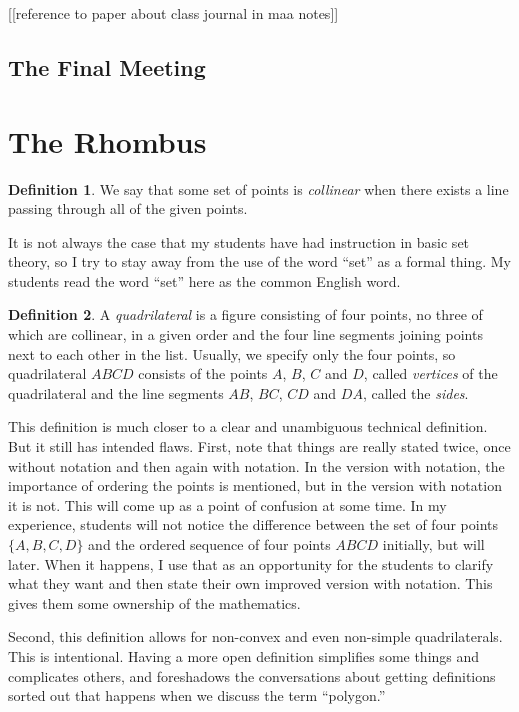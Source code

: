 \documentclass{tufte-handout}
\theoremstyle{definition}
\newtheorem*{definition}{Definition}
\begin{document}
[[reference to paper about class journal in maa notes]]


\subsection{The Final Meeting}

\clearpage
\setcounter{section}{1}
\section{The Rhombus}

\begin{definition}
\label{defn:collinear}
We say that some set of points is \emph{collinear} when there exists a line passing through all of the given points.
\end{definition}

It is not always the case that my students have had instruction in basic set theory, so I try to stay away from the use of the word ``set'' as a formal thing. My students read the word ``set'' here as the common English word.


\begin{definition}\label{defn:quadrilateral}
A \emph{quadrilateral} is a figure consisting of four points, no three of which are collinear, in a given order and the four line segments joining points next to each other in the list.
Usually, we specify only the four points, so quadrilateral $ABCD$ consists of the points $A$, $B$, $C$ and $D$, called \emph{vertices} of the quadrilateral and the line segments $AB$, $BC$, $CD$ and $DA$, called the \emph{sides}.
\end{definition}

This definition is much closer to a clear and unambiguous technical definition. But it still has intended flaws. 
First, note that things are really stated twice, once without notation and then again with notation. 
In the version with notation, the importance of ordering the points is mentioned, but in the version with notation it is not. 
This will come up as a point of confusion at some time. 
In my experience, students will not notice the difference between the set of four points $\{A, B, C, D\}$ and the ordered sequence of four points $ABCD$ initially, but will later. 
When it happens, I use that as an opportunity for the students to clarify what they want and then state their own improved version with notation. 
This gives them some ownership of the mathematics.

Second, this definition allows for non-convex and even non-simple quadrilaterals. This is intentional. Having a more open definition simplifies some things and complicates others, and foreshadows the conversations about getting definitions sorted out that happens when we discuss the term ``polygon.''
\end{document}
